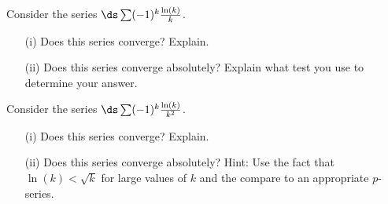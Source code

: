 \begin{activity} \label{8.4.Act5}
 \ba
 \item Consider the series $\ds \sum (-1)^k \frac{\ln(k)}{k}$.
    \begin{itemize}
    \item[(i)] Does this series converge? Explain.

    \item[(ii)] Does this series converge absolutely? Explain what test you use to determine your answer. 

    \end{itemize}

 \item Consider the series $\ds \sum (-1)^k \frac{\ln(k)}{k^2}$.
     \begin{itemize}
    \item[(i)] Does this series converge? Explain.

    \item[(ii)] Does this series converge absolutely? Hint: Use the fact that $\ln(k) < \sqrt{k}$ for large values of $k$ and the compare to an appropriate $p$-series. 

    \end{itemize}

\ea
\end{activity}

